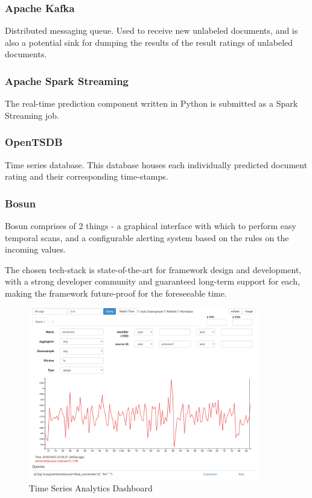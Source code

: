 \documentclass[conference]{IEEEtran}
\begin{document}
        \subsubsection{Apache Kafka} \label{kafka}
            Distributed messaging queue. 
            Used to receive new unlabeled documents, and is also a potential sink for dumping the results of the result ratings of unlabeled documents\cite{kreps2011kafka}.
        
        \subsubsection{Apache Spark Streaming} \label{spark}
            The real-time prediction component written in Python is submitted as a Spark Streaming job\cite{zaharia2012discretized}.
        
        \subsubsection{OpenTSDB} \label{opentsdb}
            Time series database. 
            This database houses each individually predicted document rating and their corresponding time-stamps\cite{opentsdb}.
        
        \subsubsection{Bosun}
            Bosun comprises of 2 things - a graphical interface with which to perform easy temporal scans, and a configurable alerting system based on the rules on the incoming values\cite{bosun_repo}. 

        The chosen tech-stack is state-of-the-art for framework design and development, with a strong developer community and guaranteed long-term support for each, making the framework future-proof for the foreseeable time.

\begin{figure}[ht] \label{fig:time-series-analytics-dashboard}
    \centering
    \includegraphics[width=0.9\textwidth]{images/bosun_dash_1.png}
    \caption{Time Series Analytics Dashboard}
\end{figure}
\end{document}
